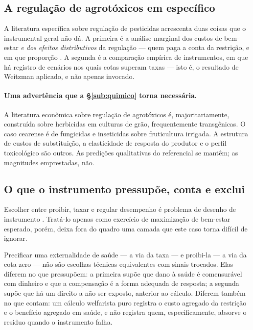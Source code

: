 \subsection{A regulação de agrotóxicos em específico}
\label{sub:regulacao}

A literatura específica sobre regulação de pesticidas acrescenta duas coisas que
o instrumental geral não dá. A primeira é a análise marginal dos custos de
bem-estar \emph{e dos efeitos distributivos} da regulação --- quem paga a conta
da restrição, e em que proporção \citep{lichtenberg1988,fernandezcornejo1998}.
A segunda é a comparação empírica de instrumentos, em que há registro de
cenários nos quais cotas superam taxas
\citep{skevas2012} --- isto é, o resultado de Weitzman aplicado, e não apenas
invocado.

\paragraph{Uma advertência que a §\ref{sub:quimico} torna necessária.} A
literatura econômica sobre regulação de agrotóxicos é, majoritariamente,
construída sobre herbicidas em culturas de grão, frequentemente transgênicas.
O caso cearense é de fungicidas e inseticidas sobre fruticultura irrigada. A
estrutura de custos de substituição, a elasticidade de resposta do produtor e o
perfil toxicológico são outros. As predições qualitativas do referencial se
mantêm; as magnitudes emprestadas, não.

\subsection{O que o instrumento pressupõe, conta e exclui}
\label{sub:normativo}

Escolher entre proibir, taxar e regular desempenho é problema de desenho de
instrumento \citep{roth2002engineer}. Tratá-lo apenas como exercício de
maximização de bem-estar esperado, porém, deixa fora do quadro uma camada que
este caso torna difícil de ignorar.

Precificar uma externalidade de saúde --- a via da taxa --- e proibi-la --- a via
da cota zero --- não são escolhas técnicas equivalentes com sinais trocados.
Elas diferem no que pressupõem: a primeira supõe que dano à saúde é comensurável
com dinheiro e que a compensação é a forma adequada de resposta; a segunda supõe
que há um direito a não ser exposto, anterior ao cálculo. Diferem também no que
contam: um cálculo welfarista puro registra o custo agregado da restrição e o
benefício agregado em saúde, e não registra quem, especificamente, absorve o
resíduo quando o instrumento falha.

